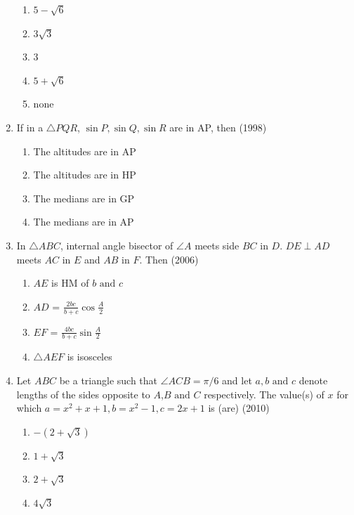 \begin{enumerate}[label=\thesubsection.\arabic*,ref=\thesubsection.\theenumi]
\begin{multicols}{2}
\begin{enumerate}
    		\item $5-\sqrt{6}$ 
    		\item $3\sqrt{3}$
    		\item $3$
    		\item $5+\sqrt{6}$ 
    		\item none
    	\end{enumerate}
    \end{multicols}
    \item If in a $\triangle PQR$, $\sin{P}, \sin{Q}, \sin{R}$ are in AP, then
    \hfill{(1998)}
    \begin{multicols}{2}
    \begin{enumerate}
    	\item The altitudes are in AP
    	\item The altitudes are in HP
    	\item The medians are in GP
    	\item The medians are in AP
    \end{enumerate}
    \end{multicols}
    \item In $\triangle ABC$, internal angle bisector of $\angle A$ meets side $BC$ in ${D}$. $DE \perp AD$ meets $AC$ in ${E}$ and $AB$ in ${F}$. Then
    \hfill{(2006)}
    \begin{multicols}{2}
    \begin{enumerate}
    	\item $AE$ is HM of $b \text{ and } c$
    	\item $AD$ = ${\frac{2bc}{b+c}}\cos{\frac{A}{2}}$
    	\item $EF$ = ${\frac{4bc}{b+c}}\sin{\frac{A}{2}}$
    	\item $\triangle AEF$ is isosceles
    \end{enumerate}
    \end{multicols}
    \item Let $ABC$ be a triangle such that $\angle ACB = \pi/6$ and let $a,b \text{ and } c$ denote lengths of the sides opposite to ${A}$,${B} \text{ and } {C}$ respectively. The value(s) of $x$ for which $a = x^{2}+x+1, b = x^{2}-1, c = 2x+1$ is (are)
    \hfill{(2010)}
    \begin{multicols}{4}
    	\begin{enumerate}
    		\item $-(2+\sqrt{3})$
    		\item $1+\sqrt{3}$
    		\item $2+\sqrt{3}$
    		\item $4\sqrt{3}$

\end{enumerate}
\end{multicols}
\end{enumerate}
